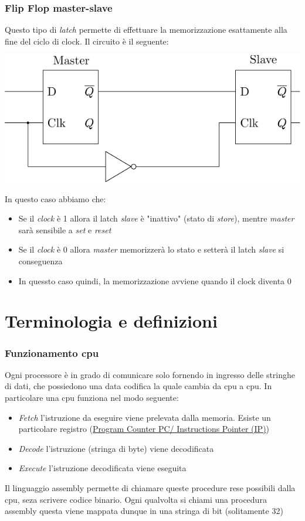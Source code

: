 \subsubsection*{Flip Flop master-slave}
Questo tipo di \textit{latch} permette di effettuare la memorizzazione esattamente alla fine del ciclo di clock. Il circuito è il seguente:
\begin{center}
	\includegraphics{Images/Flip_flop_master_slave_circuito.pdf }
\end{center}
In questo caso abbiamo che:
\begin{itemize}
	\item Se il \textit{clock} è 1 allora il latch \textit{slave} è "inattivo" (stato di \textit{store}), mentre \textit{master} sarà sensibile a \textit{set} e \textit{reset}
	\item Se il \textit{clock} è 0 allora \textit{master} memorizzerà lo stato e setterà il latch \textit{slave} si conseguenza
	\item In quessto caso quindi, la memorizzazione avviene quando il clock diventa 0
\end{itemize}
\section{Terminologia e definizioni}
\subsubsection*{Funzionamento cpu}
Ogni processore è in grado di comunicare solo fornendo in ingresso delle stringhe di dati, che possiedono una data codifica la quale cambia da cpu a cpu. In particolare una cpu funziona nel modo seguente:
\begin{itemize}
	\item \textit{Fetch} l'istruzione da eseguire viene prelevata dalla memoria. Esiste un particolare registro (\underline{Program Counter PC/ Instructions Pointer (IP)})
	\item \textit{Decode} l'istruzione (stringa di byte) viene decodificata
	\item \textit{Execute} l'istruzione decodificata viene eseguita
\end{itemize}
Il linguaggio assembly permette di chiamare queste procedure rese possibili dalla cpu, seza scrivere codice  binario. Ogni qualvolta si chiami una procedura assembly questa viene mappata dunque in una stringa di bit (solitamente 32)


